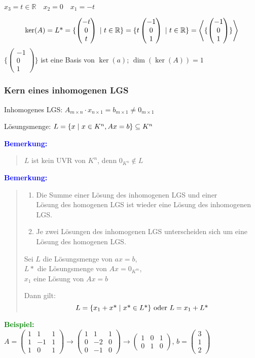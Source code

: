 \documentclass{article}
\newcommand{\smsp}{\phantom{\hspace{3px}}}
\newcommand{\blue}[1]{\textcolor{blue}{#1}}
\newcommand{\green}[1]{\textcolor{green}{#1}}
\newcommand{\ex}{\green{\textbf{Beispiel: }}}
\newcommand{\an}[1]{\blue{\textbf{Bemerkung: }}\begin{quote}#1\end{quote}}
\newcommand{\R}{\mathbb{R}}
\renewcommand{\st}{\smsp | \smsp}
\newcommand{\vvvec}[3]{\begin{pmatrix}#1\\#2\\#3\end{pmatrix}}
\newcommand{\spann}[1]{\left\langle#1\right\rangle}
\begin{document}
$x_3 = t \in \R \quad x_2 = 0 \quad x_1 = -t$

\[
    \ker(A) = L\text{*} = \{\vvvec{-t}{0}{t} \st t \in \R\} = \{t \vvvec{-1}{0}{1} \st t \in \R\} = \spann{\{\vvvec{-1}{0}{1}\}}
\]
$\{\vvvec{-1}{0}{1}\}$ ist eine Basis von $\ker(a)$; $\dim(\ker(A)) = 1$

\newpage
\subsubsection{Kern eines inhomogenen LGS}

Inhomogenes LGS: $A_{m \times n} \cdot x_{n \times 1} = b_{m \times 1} \neq 0_{m \times 1}$

Lösungsmenge: $L = \{x \st x \in K^n, Ax = b\} \subseteq K^n$

\an{
    $L$ ist kein UVR von $K^n$, denn $0_{K^n} \notin L$
}
\an{
    \begin{enumerate}
        \item Die Summe einer Lösung des inhomogenen LGS und einer\\
        Lösung des homogenen LGS ist wieder eine Lösung des inhomogenen LGS.
        \item Je zwei Lösungen des inhomogenen LGS unterscheiden sich um eine Lösung des homogenen LGS.
    \end{enumerate}

    Sei $L$ die Lösungsmenge von $ax = b$,\\
    \phantom{Sei} $L*$ die Lösungsmenge von $Ax = 0_{K^m}$,\\
    \phantom{Sei} $x_1$ eine Lösung von $Ax = b$

    Dann gilt:
    \[
        L = \{x_1 + x\text{*} \st x\text{*} \in L\text{*}\} \text{ oder } L = x_1 + L\text{*}
    \]
}

\ex\\
$A = \begin{pmatrix}
    1 & 1 & 1\\
    1 & -1 & 1\\
    1 & 0 & 1
\end{pmatrix} \to \begin{pmatrix}
    1 & 1 & 1\\
    0 & -2 & 0\\
    0 & -1 & 0
\end{pmatrix} \to \begin{pmatrix}
    1 & 0 & 1\\
    0 & 1 & 0
\end{pmatrix}$, $b = \vvvec{3}{1}{2}$
\end{document}
